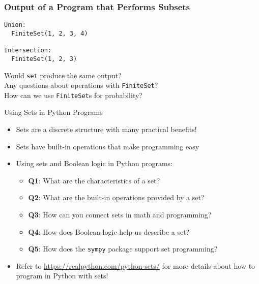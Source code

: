 \documentclass[14pt,aspectratio=169]{beamer}
\begin{document}
%
\begin{frame}[fragile]
  \frametitle{Output of a Program that Performs Subsets}
  \normalsize
  \begin{minipage}{6in}
    \vspace*{.25in}
    \begin{verbatim}
Union:
  FiniteSet(1, 2, 3, 4)

Intersection:
  FiniteSet(1, 2, 3)
    \end{verbatim}
  \end{minipage}
  \vspace*{.25in}
  \begin{center}
    \normalsize \noindent Would {\tt set} produce the same output? \\
    \normalsize \noindent Any questions about operations with {\tt FiniteSet}? \\
    \normalsize \noindent How can we use {\tt FiniteSet}s for probability? \\
  \end{center}
\end{frame}

%
\begin{frame}{Using Sets in Python Programs}
  \begin{itemize}
    \item Sets are a discrete structure with many practical benefits!
      \vspace*{-.2in}
    \item Sets have built-in operations that make programming easy
      \vspace*{-.2in}
    \item Using sets and Boolean logic in Python programs:
      \begin{itemize}
        \item {\bf Q1}: What are the characteristics of a set?
        \item {\bf Q2}: What are the built-in operations provided by a set?
        \item {\bf Q3}: How can you connect sets in math and programming?
        \item {\bf Q4}: How does Boolean logic help us describe a set?
        \item {\bf Q5}: How does the {\tt sympy} package support set programming?
      \end{itemize}
      \vspace*{-.2in}
    \item Refer to \url{https://realpython.com/python-sets/} for more details
      about how to program in Python with sets!
  \end{itemize}
\end{frame}
\end{document}
